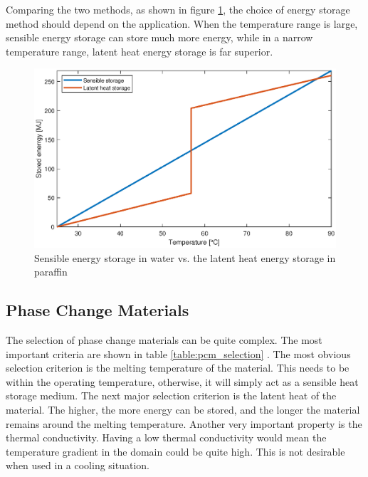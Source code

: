 Comparing the two methods, as shown in figure \ref{fig:sensible_vs_latent_storage}, the choice of energy storage method should depend on the application. When the temperature range is large, sensible energy storage can store much more energy, while in a narrow temperature range, latent heat energy storage is far superior. 
\begin{figure}[ht]
    \centering
    \includegraphics[width=0.7\linewidth]{figures/chapter_3/SensibleAndLatentStorage.eps}
    \caption{Sensible energy storage in water vs. the latent heat energy storage in paraffin}
    \label{fig:sensible_vs_latent_storage}
\end{figure}

\subsection*{Phase Change Materials}
The selection of phase change materials can be quite complex. The most important criteria are shown in table \ref{table:pcm_selection} \cite{Gadhave_Prabhune_Pathan_2020}. The most obvious selection criterion is the melting temperature of the material. This needs to be within the operating temperature, otherwise, it will simply act as a sensible heat storage medium. The next major selection criterion is the latent heat of the material. The higher, the more energy can be stored, and the longer the material remains around the melting temperature. Another very important property is the thermal conductivity. Having a low thermal conductivity would mean the temperature gradient in the domain could be quite high. This is not desirable when used in a cooling situation. 


